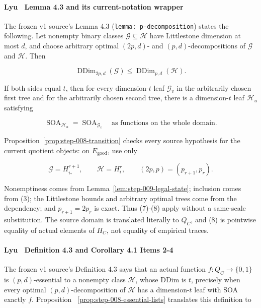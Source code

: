 \paragraph{Lyu~\citep{lyu2025} Lemma 4.3 and its  current-notation wrapper}

The frozen v1 source's Lemma 4.3 (\texttt{lemma: p-decomposition}) states the
following. Let nonempty binary classes
\(\mathcal G\subseteq\mathcal H\) have Littlestone dimension at most \(d\),
and choose arbitrary optimal \((2p,d)\)- and \((p,d)\)-decompositions of
\(\mathcal G\) and \(\mathcal H\). Then

\[
 \operatorname{DDim}_{2p,d}(\mathcal G)
 \leq\operatorname{DDim}_{p,d}(\mathcal H).
 \tag{7}
\]

If both sides equal \(t\), then for every dimension-\(t\) leaf
\(\mathcal G_v\) in the arbitrarily chosen first tree and for the
arbitrarily chosen second tree, there is a dimension-\(t\) leaf
\(\mathcal H_u\) satisfying

\[
 \operatorname{SOA}_{\mathcal H_u}
 =\operatorname{SOA}_{\mathcal G_v}
 \quad\text{as functions on the whole domain}.
 \tag{8}
\]

Proposition~\ref{prop:step-008-transition} checks every source
hypothesis for the current quotient objects: on \(E_{\mathrm{good}}\), use
only

\[
 \mathcal G=H_{i_*}^{r+1},\qquad
 \mathcal H=H_i^r,\qquad
 (2p,p)=(p_{r+1},p_r).
 \tag{9}
\]

Nonemptiness comes from Lemma~\ref{lem:step-009-legal-state}; inclusion
comes from (3); the Littlestone bounds and arbitrary optimal trees come
from the  dependency; and \(p_{r+1}=2p_r\) is exact. Thus (7)-(8)
apply without a same-scale substitution. The source domain is translated
literally to \(Q_C\), and (8) is pointwise equality of actual elements of
\(H_C\), not equality of empirical traces.

\paragraph{Lyu~\citep{lyu2025} Definition 4.3 and Corollary 4.1 Items 2-4}

The frozen v1 source's Definition 4.3 says that an actual function
\(f:Q_C\to\{0,1\}\) is \((p,d)\)-essential to a nonempty class
\(\mathcal H\), whose DDim is \(t\), precisely when every optimal
\((p,d)\)-decomposition of \(\mathcal H\) has a dimension-\(t\) leaf with
SOA exactly \(f\). Proposition
~\ref{prop:step-008-essential-lists} translates this definition to

